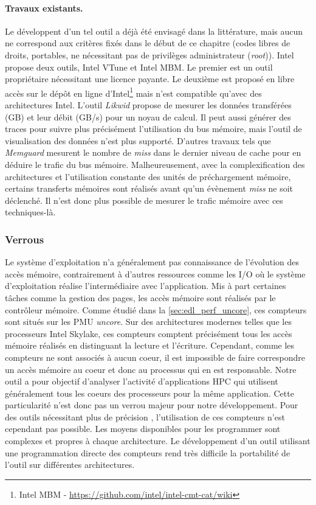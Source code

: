         
        \paragraph{Travaux existants.} Le développent d'un tel outil a déjà été envisagé dans la littérature, mais aucun ne correspond aux critères fixés dans le début de ce chapitre (codes libres de droits, portables, ne nécessitant pas de privilèges administrateur (\textit{root})). 
        Intel propose deux outils, Intel VTune et Intel MBM. Le premier est un outil propriétaire nécessitant une licence payante. Le deuxième est proposé en libre accès sur le dépôt en ligne d'Intel\footnote{Intel MBM - \url{https://github.com/intel/intel-cmt-cat/wiki}} mais n'est compatible qu'avec des architectures Intel. 
        L'outil \textit{Likwid} propose de mesurer les données transférées (GB) et leur débit (GB/s) pour un noyau de calcul. Il peut aussi générer des traces pour suivre plus précisément l'utilisation du bus mémoire, mais l'outil de visualisation des données n'est plus supporté.
        D'autres travaux tels que \textit{Memguard}\cite{Yun2013} mesurent le nombre de \textit{miss} dans le dernier niveau de cache pour en déduire le trafic du bus mémoire. Malheureusement, avec la complexification des architectures et l'utilisation constante des unités de préchargement mémoire, certains transferts mémoires sont réalisés avant qu'un évènement \textit{miss} ne soit déclenché. Il n'est donc plus possible de mesurer le trafic mémoire avec ces techniques-là. 
        
           

    \subsubsection{Verrous}
        
        
        Le système d'exploitation n'a généralement pas connaissance de l'évolution des accès mémoire, contrairement à d'autres ressources comme les I/O où le système d'exploitation réalise l'intermédiaire avec l'application. Mis à part certaines tâches comme la gestion des pages, les accès mémoire sont réalisés par le contrôleur mémoire. Comme étudié dans la \autoref{sec:edl_perf_uncore}, ces compteurs sont situés sur les PMU \textit{uncore}. Sur des architectures modernes telles que les processeurs Intel Skylake, ces compteurs comptent précisément tous les accès mémoire réalisés en distinguant la lecture et  l'écriture. Cependant, comme les compteurs ne sont associés à aucun coeur, il est impossible de faire correspondre un accès mémoire au coeur et donc au processus qui en est responsable. Notre outil a pour objectif d'analyser l'activité d'applications HPC qui utilisent généralement tous les coeurs des processeurs pour la même application. Cette particularité n'est donc pas un verrou majeur pour notre développement. Pour des outils nécessitant plus de précision \cite{Larysch2016a}, l'utilisation de ces compteurs n'est cependant pas possible. Les moyens disponibles pour les programmer sont complexes et propres à chaque architecture. Le développement d'un outil utilisant une programmation directe des compteurs rend très difficile la portabilité de l'outil sur différentes architectures.
        
